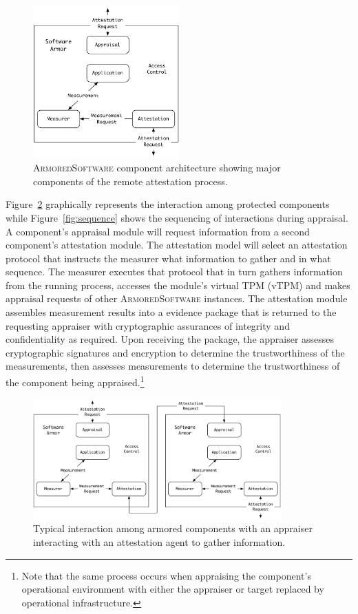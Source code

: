 \documentclass[10pt]{article}
\begin{document}
\begin{figure}
  \centering
  \includegraphics[width=0.5\textwidth]{figures/architecture.pdf}
  \caption{\textsc{ArmoredSoftware} component architecture showing
    major components of the remote attestation process.}
  \label{fig:architecture}
\end{figure}

Figure~\ref{fig:system} graphically represents the interaction among
protected components while Figure~\ref{fig:sequence} shows the
sequencing of interactions during appraisal.  A component's appraisal
module will request information from a second component's attestation
module.  The attestation model will select an attestation protocol
that instructs the measurer what information to gather and in what
sequence.  The measurer executes that protocol that in turn gathers
information from the running process, accesses the module's virtual
TPM (vTPM) and makes appraisal requests of other
\textsc{ArmoredSoftware} instances.  The attestation module assembles
measurement results into a evidence package that is returned to the
requesting appraiser with cryptographic assurances of integrity and
confidentiality as required.  Upon receiving the package, the
appraiser assesses cryptographic signatures and encryption to
determine the trustworthiness of the measurements, then assesses
measurements to determine the trustworthiness of the component being
appraised.\footnote{Note that the same process occurs when appraising
  the component's operational environment with either the appraiser or
  target replaced by operational infrastructure.}

\begin{figure}[hbtp]
  \centering
  \includegraphics[width=0.85\textwidth]{figures/system.pdf}
  \caption{Typical interaction among armored components with an
    appraiser interacting with an attestation agent to gather
    information.}
  \label{fig:system}
\end{figure}


\end{document}
